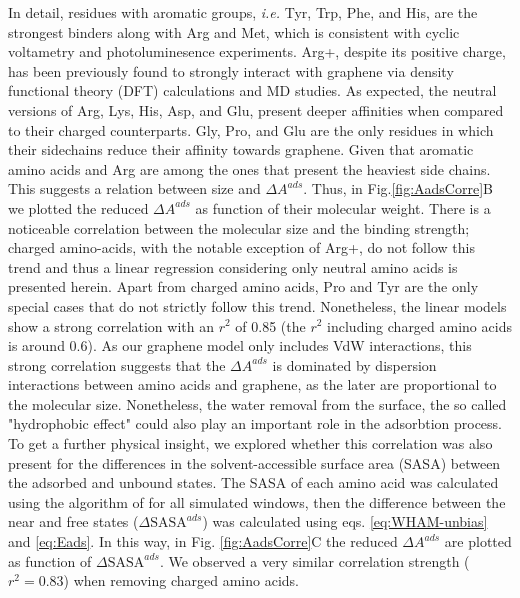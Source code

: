 \documentclass[journal=jcisd8,manuscript=article,layout=twocolumn]{achemso}
\begin{document}
In detail, residues with aromatic groups, \emph{i.e.} Tyr, Trp, Phe, and His, are the strongest binders along with Arg and Met, which is consistent with cyclic voltametry and photoluminesence experiments.\cite{Mallineni_2016}
Arg+, despite its positive charge, has been previously found to strongly interact with graphene via density functional theory (DFT) calculations \cite{Tavassoli_2015, Singla_2016, Zhiani_2017} and MD studies.\cite{Pandey_2012, Dragneva_2013}
As expected, the neutral versions of Arg, Lys, His, Asp, and Glu, present deeper affinities when compared to their charged counterparts.
Gly, Pro, and Glu are the only residues  in which their sidechains reduce their affinity towards graphene.
Given that aromatic amino acids and Arg are among the ones that present the heaviest side chains.
This suggests a relation between size and $\Delta A^{ads}$.
Thus, in Fig.\ref{fig:AadsCorre}B we plotted the reduced $\Delta A^{ads}$ as function of their molecular weight.
There is a noticeable correlation between the molecular size and the binding strength; charged amino-acids, with the notable exception of Arg+, do not follow this trend and thus a linear regression considering only neutral amino acids is presented herein.
Apart from charged amino acids, Pro and Tyr are the only special cases that do not strictly follow this trend.
Nonetheless, the linear models show a strong correlation with an $r^2$ of 0.85 (the $r^2$ including charged amino acids is around 0.6).
As our graphene model only includes VdW interactions, this strong correlation suggests that the $\Delta A^{ads}$ is dominated by dispersion interactions between amino acids and graphene, as the later are proportional to the molecular size. Nonetheless, the water removal from the surface, the so called "hydrophobic effect" could also play an important role in the adsorbtion process.
To get a further physical insight, we explored whether this correlation was also present for the differences in the solvent-accessible surface area (SASA) between the adsorbed and unbound states.
The SASA of each amino acid was calculated using the algorithm of \citet{Lee_1971} for all simulated windows, then the difference between the near and free states ($\Delta\textrm{SASA}^{ads}$) was calculated using eqs. \ref{eq:WHAM-unbias} and \ref{eq:Eads}.
In this way, in Fig. \ref{fig:AadsCorre}C the reduced $\Delta A^{ads}$ are plotted as function of $\Delta\textrm{SASA}^{ads}$.
We observed a very similar correlation strength ($r^2=0.83$) when removing charged amino acids.
\end{document}
